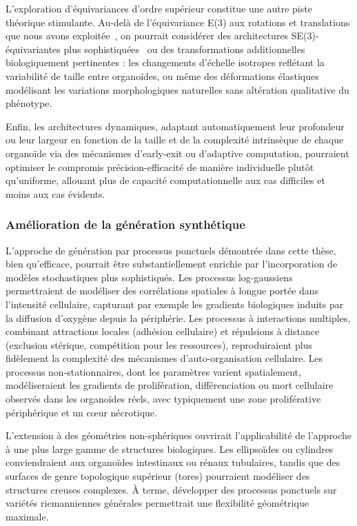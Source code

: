 L'exploration d'équivariances d'ordre supérieur constitue une autre piste théorique stimulante. Au-delà de l'équivariance E(3) aux rotations et translations que nous avons exploitée~\cite{Satorras2021}, on pourrait considérer des architectures SE(3)-équivariantes plus sophistiquées~\cite{Fuchs2020,Thomas2018} ou des transformations additionnelles biologiquement pertinentes : les changements d'échelle isotropes reflétant la variabilité de taille entre organoïdes, ou même des déformations élastiques modélisant les variations morphologiques naturelles sans altération qualitative du phénotype.

Enfin, les architectures dynamiques, adaptant automatiquement leur profondeur ou leur largeur en fonction de la taille et de la complexité intrinsèque de chaque organoïde via des mécanismes d'early-exit ou d'adaptive computation, pourraient optimiser le compromis précision-efficacité de manière individuelle plutôt qu'uniforme, allouant plus de capacité computationnelle aux cas difficiles et moins aux cas évidents.

\subsubsection{Amélioration de la génération synthétique}

L'approche de génération par processus ponctuels démontrée dans cette thèse, bien qu'efficace, pourrait être substantiellement enrichie par l'incorporation de modèles stochastiques plus sophistiqués. Les processus log-gaussiens permettraient de modéliser des corrélations spatiales à longue portée dans l'intensité cellulaire, capturant par exemple les gradients biologiques induits par la diffusion d'oxygène depuis la périphérie. Les processus à interactions multiples, combinant attractions locales (adhésion cellulaire) et répulsions à distance (exclusion stérique, compétition pour les ressources), reproduiraient plus fidèlement la complexité des mécanismes d'auto-organisation cellulaire. Les processus non-stationnaires, dont les paramètres varient spatialement, modéliseraient les gradients de prolifération, différenciation ou mort cellulaire observés dans les organoïdes réels, avec typiquement une zone proliférative périphérique et un cœur nécrotique.

L'extension à des géométries non-sphériques ouvrirait l'applicabilité de l'approche à une plus large gamme de structures biologiques. Les ellipsoïdes ou cylindres conviendraient aux organoïdes intestinaux ou rénaux tubulaires, tandis que des surfaces de genre topologique supérieur (tores) pourraient modéliser des structures creuses complexes. À terme, développer des processus ponctuels sur variétés riemanniennes générales permettrait une flexibilité géométrique maximale.

